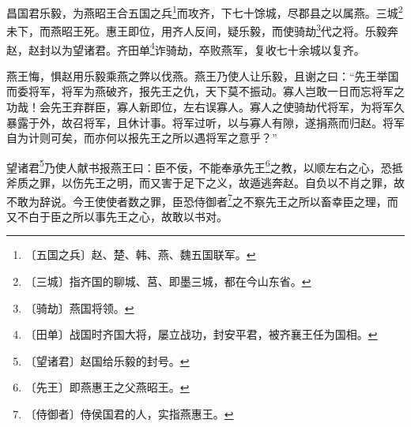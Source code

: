 \documentclass[12pt,UTF-8,openany,a4]{ctexbook}
\begin{document}
\begin{large}
    
    昌国君乐毅，为燕昭王合五国之兵\footnote{〔五国之兵〕\yiwen 赵、楚、韩、燕、魏五国联军。}而攻齐，下七十馀城，尽郡县之以属燕。三城\footnote{〔三城〕\yiwen 指齐国的聊城、莒、即墨三城，都在今山东省。}未下，而燕昭王死。惠王即位，用齐人反间，疑乐毅，而使骑劫\footnote{〔骑劫〕\yiwen 燕国将领。}代之将。乐毅奔赵，赵封以为望诸君。齐田单\footnote{〔田单〕\yiwen 战国时齐国大将，屡立战功，封安平君，被齐襄王任为国相。}诈骑劫，卒败燕军，复收七十余城以复齐。
    
    燕王悔，惧赵用乐毅乘燕之弊以伐燕。燕王乃使人让乐毅，且谢之曰：“先王举国而委将军，将军为燕破齐，报先王之仇，天下莫不振动。寡人岂敢一日而忘将军之功哉！会先王弃群臣，寡人新即位，左右误寡人。寡人之使骑劫代将军，为将军久暴露于外，故召将军，且休计事。将军过听，以与寡人有隙，遂捐燕而归赵。将军自为计则可矣，而亦何以报先王之所以遇将军之意乎？”
    
    望诸君\footnote{〔望诸君〕\yiwen 赵国给乐毅的封号。}乃使人献书报燕王曰：臣不佞，不能奉承先王\footnote{〔先王〕\yiwen 即燕惠王之父燕昭王。}之教，以顺左右之心，恐抵斧质之罪，以伤先王之明，而又害于足下之义，故遁逃奔赵。自负以不肖之罪，故不敢为辞说。今王使使者数之罪，臣恐侍御者\footnote{〔侍御者〕\yiwen 侍侯国君的人，实指燕惠王。}之不察先王之所以畜幸臣之理，而又不白于臣之所以事先王之心，故敢以书对。
    

\end{large}
\end{document}
